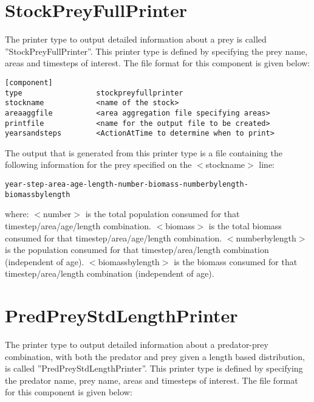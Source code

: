 \documentclass [a4paper, 10pt]{book}
\begin{document}
\section{StockPreyFullPrinter}\label{sec:stockpreyfullprinter}
The printer type to output detailed information about a prey is called ''StockPreyFullPrinter''.  This printer type is defined by specifying the prey name, areas and timesteps of interest.  The file format for this component is given below:

{\small\begin{verbatim}
[component]
type                 stockpreyfullprinter
stockname            <name of the stock>
areaaggfile          <area aggregation file specifying areas>
printfile            <name for the output file to be created>
yearsandsteps        <ActionAtTime to determine when to print>
\end{verbatim}}

The output that is generated from this printer type is a file containing the following information for the prey specified on the $<$stockname$>$ line:

{\small\begin{verbatim}
year-step-area-age-length-number-biomass-numberbylength-biomassbylength
\end{verbatim}}

where:\newline
$<$number$>$ is the total population consumed for that timestep/area/age/length combination.\newline
$<$biomass$>$ is the total biomass consumed for that timestep/area/age/length combination.\newline
$<$numberbylength$>$ is the population consumed for that timestep/area/length combination (independent of age).\newline
$<$biomassbylength$>$ is the biomass consumed for that timestep/area/length combination (independent of age).

\section{PredPreyStdLengthPrinter}\label{sec:predpreystdlengthprinter}
The printer type to output detailed information about a predator-prey combination, with both the predator and prey given a length based distribution, is called ''PredPreyStdLengthPrinter''.  This printer type is defined by specifying the predator name, prey name, areas and timesteps of interest.  The file format for this component is given below:
\end{document}
